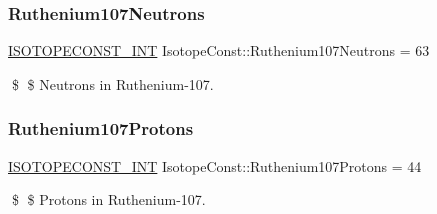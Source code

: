 \subsubsection{\texorpdfstring{Ruthenium107\+Neutrons}{Ruthenium107Neutrons}}
{\footnotesize\ttfamily \mbox{\hyperlink{group___isotope_const-_macros_ga5f18360b3e99483a35c32d789e62621c}{I\+S\+O\+T\+O\+P\+E\+C\+O\+N\+S\+T\+\_\+\+I\+NT}} Isotope\+Const\+::\+Ruthenium107\+Neutrons = 63}

\$ \$ Neutrons in Ruthenium-\/107. \mbox{\label{group___isotope_const-_ruthenium-_ru107_ga650a814d1ae529efac2e21ad68769637}} 
\subsubsection{\texorpdfstring{Ruthenium107\+Protons}{Ruthenium107Protons}}
{\footnotesize\ttfamily \mbox{\hyperlink{group___isotope_const-_macros_ga5f18360b3e99483a35c32d789e62621c}{I\+S\+O\+T\+O\+P\+E\+C\+O\+N\+S\+T\+\_\+\+I\+NT}} Isotope\+Const\+::\+Ruthenium107\+Protons = 44}

\$ \$ Protons in Ruthenium-\/107. 